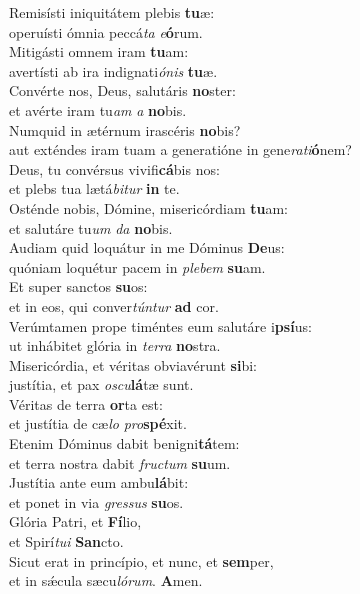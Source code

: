 \evenverse Remisísti iniquitátem plebis \textbf{tu}æ:~\*\\
\evenverse operuísti ómnia peccá\textit{ta} \textit{e}\textbf{ó}rum.\\
\oddverse Mitigásti omnem iram \textbf{tu}am:~\*\\
\oddverse avertísti ab ira indignati\textit{ó}\textit{nis} \textbf{tu}æ.\\
\evenverse Convérte nos, Deus, salutáris \textbf{no}ster:~\*\\
\evenverse et avérte iram tu\textit{am} \textit{a} \textbf{no}bis.\\
\oddverse Numquid in ætérnum irascéris \textbf{no}bis?~\*\\
\oddverse aut exténdes iram tuam a generatióne in gene\textit{ra}\textit{ti}\textbf{ó}nem?\\
\evenverse Deus, tu convérsus vivifi\textbf{cá}bis nos:~\*\\
\evenverse et plebs tua lætá\textit{bi}\textit{tur} \textbf{in} te.\\
\oddverse Osténde nobis, Dómine, misericórdiam \textbf{tu}am:~\*\\
\oddverse et salutáre tu\textit{um} \textit{da} \textbf{no}bis.\\
\evenverse Audiam quid loquátur in me Dóminus \textbf{De}us:~\*\\
\evenverse quóniam loquétur pacem in \textit{ple}\textit{bem} \textbf{su}am.\\
\oddverse Et super sanctos \textbf{su}os:~\*\\
\oddverse et in eos, qui conver\textit{tún}\textit{tur} \textbf{ad} cor.\\
\evenverse Verúmtamen prope timéntes eum salutáre i\textbf{psí}us:~\*\\
\evenverse ut inhábitet glória in \textit{ter}\textit{ra} \textbf{no}stra.\\
\oddverse Misericórdia, et véritas obviavérunt \textbf{si}bi:~\*\\
\oddverse justítia, et pax \textit{o}\textit{scu}\textbf{lá}tæ sunt.\\
\evenverse Véritas de terra \textbf{or}ta est:~\*\\
\evenverse et justítia de cæ\textit{lo} \textit{pro}\textbf{spé}xit.\\
\oddverse Etenim Dóminus dabit benigni\textbf{tá}tem:~\*\\
\oddverse et terra nostra dabit \textit{fru}\textit{ctum} \textbf{su}um.\\
\evenverse Justítia ante eum ambu\textbf{lá}bit:~\*\\
\evenverse et ponet in via \textit{gres}\textit{sus} \textbf{su}os.\\
\oddverse Glória Patri, et \textbf{Fí}lio,~\*\\
\oddverse et Spirí\textit{tu}\textit{i} \textbf{San}cto.\\
\evenverse Sicut erat in princípio, et nunc, et \textbf{sem}per,~\*\\
\evenverse et in sǽcula sæcu\textit{ló}\textit{rum}. \textbf{A}men.\\
